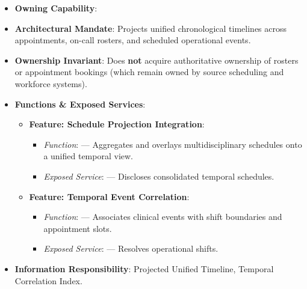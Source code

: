 \begin{itemize}

\item
\textbf{Owning Capability}: \texttt{}



\item
\textbf{Architectural Mandate}: Projects unified chronological timelines across appointments, on-call rosters, and scheduled operational events.



\item
\textbf{Ownership Invariant}: Does \textbf{not} acquire authoritative ownership of rosters or appointment bookings (which remain owned by source scheduling and workforce systems).



\item
\textbf{Functions \& Exposed Services}:


\begin{itemize}

\item
\textbf{Feature: Schedule Projection Integration}:


\begin{itemize}

\item
\emph{Function}: \texttt{} — Aggregates and overlays multidisciplinary schedules onto a unified temporal view.



\item
\emph{Exposed Service}: \texttt{} — Discloses consolidated temporal schedules.



\end{itemize}


\item
\textbf{Feature: Temporal Event Correlation}:


\begin{itemize}

\item
\emph{Function}: \texttt{} — Associates clinical events with shift boundaries and appointment slots.



\item
\emph{Exposed Service}: \texttt{} — Resolves operational shifts.



\end{itemize}


\end{itemize}


\item
\textbf{Information Responsibility}: Projected Unified Timeline, Temporal Correlation Index.



\end{itemize}
\label{rad:ise:212}

